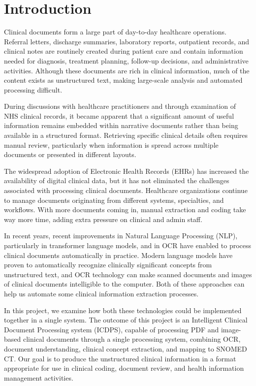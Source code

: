 \chapter{Introduction}

Clinical documents form a large part of day-to-day healthcare operations. Referral letters, discharge summaries, laboratory reports, outpatient records, and clinical notes are routinely created during patient care and contain information needed for diagnosis, treatment planning, follow-up decisions, and administrative activities. Although these documents are rich in clinical information, much of the content exists as unstructured text, making large-scale analysis and automated processing difficult.

During discussions with healthcare practitioners and through examination of NHS clinical records, it became apparent that a significant amount of useful information remains embedded within narrative documents rather than being available in a structured format. Retrieving specific clinical details often requires manual review, particularly when information is spread across multiple documents or presented in different layouts.

The widespread adoption of Electronic Health Records (EHRs) has increased the availability of digital clinical data, but it has not eliminated the challenges associated with processing clinical documents. Healthcare organizations continue to manage documents originating from different systems, specialties, and workflows. With more documents coming in, manual extraction and coding take way more time, adding extra pressure on clinical and admin staff. 

In recent years, recent improvements in Natural Language Processing (NLP), particularly in transformer language models, and in OCR have enabled to process clinical documents automatically in practice. Modern language models have proven to automatically recognize clinically significant concepts from unstructured text, and OCR technology can make scanned documents and images of clinical documents intelligible to the computer. Both of these approaches can help us automate some clinical information extraction processes.

In this project, we examine how both these technologies could be implemented together in a single system. The outcome of this project is an Intelligent Clinical Document Processing system (ICDPS), capable of processing PDF and image-based clinical documents through a single processing system, combining OCR, document understanding, clinical concept extraction, and mapping to SNOMED CT. Our goal is to produce the unstructured clinical information in a format appropriate for use in clinical coding, document review, and health information management activities.

